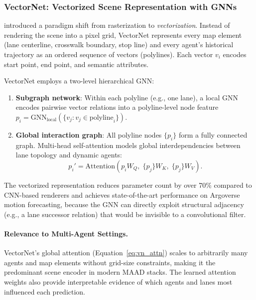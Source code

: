 \documentclass[12pt, a4paper]{article}
\begin{document}
\subsubsection{VectorNet: Vectorized Scene Representation with GNNs}
\label{sec:vectornet}

\citet{gao2020vectornet} introduced a paradigm shift from rasterization to
\emph{vectorization}. Instead of rendering the scene into a pixel grid, VectorNet
represents every map element (lane centerline, crosswalk boundary, stop line) and
every agent's historical trajectory as an ordered sequence of vectors (polylines).
Each vector $v_i$ encodes start point, end point, and semantic attributes.

VectorNet employs a two-level hierarchical GNN:
\begin{enumerate}[noitemsep]
  \item \textbf{Subgraph network}: Within each polyline (e.g., one lane), a local
        GNN encodes pairwise vector relations into a polyline-level node feature
        $p_i = \text{GNN}_{\text{local}}(\{v_j : v_j \in \text{polyline}_i\})$.
  \item \textbf{Global interaction graph}: All polyline nodes $\{p_i\}$ form a
        fully connected graph. Multi-head self-attention models global
        interdependencies between lane topology and dynamic agents:
        \begin{equation}
          p_i' = \text{Attention}\!\left( p_i W_Q,\; \{p_j\} W_K,\; \{p_j\} W_V \right).
          \label{eq:vn_attn}
        \end{equation}
\end{enumerate}
The vectorized representation reduces parameter count by over 70\% compared to
CNN-based renderers and achieves state-of-the-art performance on Argoverse motion
forecasting, because the GNN can directly exploit structural adjacency (e.g., a
lane successor relation) that would be invisible to a convolutional filter.

\paragraph{Relevance to Multi-Agent Settings.}
VectorNet's global attention (Equation~\ref{eq:vn_attn}) scales to arbitrarily
many agents and map elements without grid-size constraints, making it the
predominant scene encoder in modern MAAD stacks. The learned attention weights
also provide interpretable evidence of which agents and lanes most influenced
each prediction.
\end{document}
